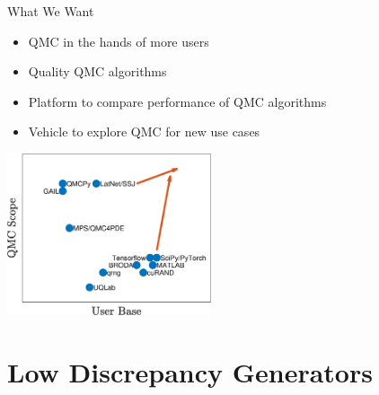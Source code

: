 \documentclass[11pt,compress,xcolor={usenames,dvipsnames},aspectratio=169]{beamer}
\begin{document}
\begin{frame}{What We Want}
\begin{multicols}{2}
	\begin{itemize}
		\item QMC in the hands of more users
		
		\item Quality QMC algorithms
		
		\item Platform to compare performance of QMC algorithms
		
		\item Vehicle to explore QMC for new use cases
		
	\end{itemize}
	
	\columnbreak
\includegraphics[width = 0.45\textwidth]{QMCSoftwarePlot.eps}	
\end{multicols}

\end{frame}


\section{Low Discrepancy Generators}
\end{document}
